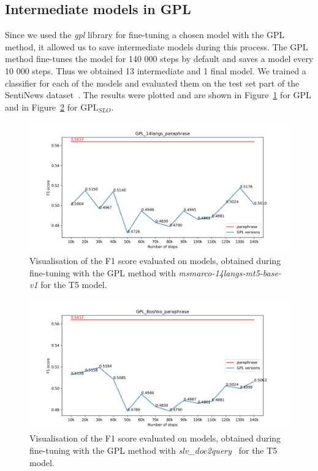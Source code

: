 \documentclass[fleqn,moreauthors,10pt]{ds_report}
\begin{document}


\subsection*{Intermediate models in GPL}
Since we used the \textit{gpl} library for fine-tuning a chosen model with the GPL method, it allowed us to save intermediate models during this process. The GPL method fine-tunes the model for 140 000 steps by default and saves a model every 10 000 steps. Thus we obtained 13 intermediate and 1 final model. We trained a classifier for each of the models and evaluated them on the test set part of the SentiNews dataset~\cite{sentiNews}. The results were plotted and are shown in Figure~\ref{fig:gpl-versions} for GPL and in Figure~\ref{fig:gpl-slo-versions} for $\text{GPL}_{SLO}$.

\begin{figure}[ht]\centering
	\vspace{12 pt}
	\includegraphics[width=\linewidth]{GPL_14langs_paraphrase.png}
	\vspace{5 pt}
	\caption{Visualisation of the F1 score evaluated on models, obtained during fine-tuning with the GPL method with {\it msmarco-14langs-mt5-base-v1} \cite{msmarco14langs} for the T5 model.}
	\label{fig:gpl-versions}
\end{figure}

\begin{figure}[ht]\centering
	\vspace{12 pt}
	\includegraphics[width=\linewidth]{GPL_Boshko_paraphrase.png}
	\vspace{5 pt}
	\caption{Visualisation of the F1 score evaluated on models, obtained during fine-tuning with the GPL method with {\it slv\_doc2query}~\cite{boshko} for the T5 model.}
	\label{fig:gpl-slo-versions}
\end{figure}
\end{document}
